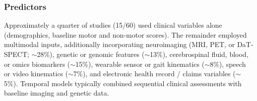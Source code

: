 \subsubsection{Predictors}
Approximately a quarter of studies (15/60) used clinical variables alone (demographics, baseline motor and non-motor scores). The remainder employed multimodal inputs, additionally incorporating neuroimaging (MRI, PET, or DaT-SPECT; $\sim$28\%), genetic or genomic features ($\sim$13\%), cerebrospinal fluid, blood, or omics biomarkers ($\sim$15\%), wearable sensor or gait kinematics ($\sim$8\%), speech or video kinematics ($\sim$7\%), and electronic health record / claims variables ($\sim$5\%). Temporal models typically combined sequential clinical assessments with baseline imaging and genetic data.

